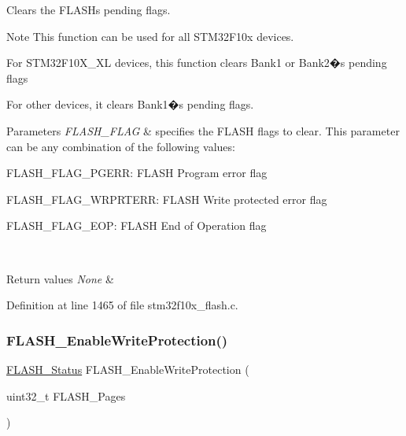 Clears the F\+L\+A\+SH\textquotesingle{}s pending flags. 

\begin{DoxyNote}{Note}
This function can be used for all S\+T\+M32\+F10x devices.
\begin{DoxyItemize}
\item For S\+T\+M32\+F10\+X\+\_\+\+XL devices, this function clears Bank1 or Bank2�s pending flags
\item For other devices, it clears Bank1�s pending flags. 
\end{DoxyItemize}
\end{DoxyNote}

\begin{DoxyParams}{Parameters}
{\em F\+L\+A\+S\+H\+\_\+\+F\+L\+AG} & specifies the F\+L\+A\+SH flags to clear. This parameter can be any combination of the following values\+: \begin{DoxyItemize}
\item F\+L\+A\+S\+H\+\_\+\+F\+L\+A\+G\+\_\+\+P\+G\+E\+RR\+: F\+L\+A\+SH Program error flag \item F\+L\+A\+S\+H\+\_\+\+F\+L\+A\+G\+\_\+\+W\+R\+P\+R\+T\+E\+RR\+: F\+L\+A\+SH Write protected error flag \item F\+L\+A\+S\+H\+\_\+\+F\+L\+A\+G\+\_\+\+E\+OP\+: F\+L\+A\+SH End of Operation flag \end{DoxyItemize}
\\
\hline
\end{DoxyParams}

\begin{DoxyRetVals}{Return values}
{\em None} & \\
\hline
\end{DoxyRetVals}


Definition at line 1465 of file stm32f10x\+\_\+flash.\+c.

\mbox{\label{group___f_l_a_s_h___exported___functions_gabad10c15e2d1ff1cb9e1083d08a9e763}} 
\subsubsection{\texorpdfstring{F\+L\+A\+S\+H\+\_\+\+Enable\+Write\+Protection()}{FLASH\_EnableWriteProtection()}}
{\footnotesize\ttfamily \hyperlink{group___f_l_a_s_h___exported___types_gadc63a6f3404ff1f71229a66915e9cdc0}{F\+L\+A\+S\+H\+\_\+\+Status} F\+L\+A\+S\+H\+\_\+\+Enable\+Write\+Protection (\begin{DoxyParamCaption}\item[{uint32\+\_\+t}]{F\+L\+A\+S\+H\+\_\+\+Pages }\end{DoxyParamCaption})}



